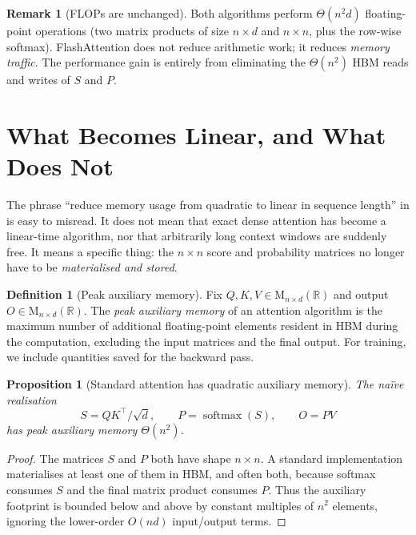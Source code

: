 \documentclass[11pt]{amsart}
\theoremstyle{plain}
\newtheorem{proposition}[theorem]{Proposition}
\theoremstyle{definition}
\newtheorem{definition}[theorem]{Definition}
\newtheorem{remark}[theorem]{Remark}
\newcommand{\R}{\mathbb{R}}
\newcommand{\Mat}[2]{\mathrm{M}_{#1 \times #2}(\R)}
\newcommand{\softmax}{\operatorname{softmax}}
\begin{document}
\begin{remark}[FLOPs are unchanged]
Both algorithms perform $\Theta(n^2 d)$ floating-point operations
(two matrix products of size $n\times d$ and $n\times n$, plus the
row-wise softmax).  FlashAttention does not reduce arithmetic work; it
reduces \emph{memory traffic}.  The performance gain is entirely from
eliminating the $\Theta(n^2)$ HBM reads and writes of $S$ and $P$.
\end{remark}

\section{What Becomes Linear, and What Does Not}
\label{sec:what-becomes-linear}

The phrase ``reduce memory usage from quadratic to linear in sequence length''
in \cite{Dao2023} is easy to misread.  It does not mean that exact dense
attention has become a linear-time algorithm, nor that arbitrarily long context
windows are suddenly free.  It means a specific thing: the $n\times n$ score
and probability matrices no longer have to be \emph{materialised and stored}.

\begin{definition}[Peak auxiliary memory]
\label{def:peak-auxiliary-memory}
Fix $Q,K,V\in\Mat{n}{d}$ and output $O\in\Mat{n}{d}$.  The \emph{peak
auxiliary memory} of an attention algorithm is the maximum number of additional
floating-point elements resident in HBM during the computation, excluding the
input matrices and the final output.  For training, we include quantities saved
for the backward pass.
\end{definition}

\begin{proposition}[Standard attention has quadratic auxiliary memory]
\label{prop:standard-quadratic-aux-memory}
The na\"ive realisation
\[
    S=QK^\top/\sqrt{d},\qquad P=\softmax(S),\qquad O=PV
\]
has peak auxiliary memory $\Theta(n^2)$.
\end{proposition}
\begin{proof}
The matrices $S$ and $P$ both have shape $n\times n$.  A standard
implementation materialises at least one of them in HBM, and often both,
because softmax consumes $S$ and the final matrix product consumes $P$.
Thus the auxiliary footprint is bounded below and above by constant multiples
of $n^2$ elements, ignoring the lower-order $O(nd)$ input/output terms.
\end{proof}
\end{document}
